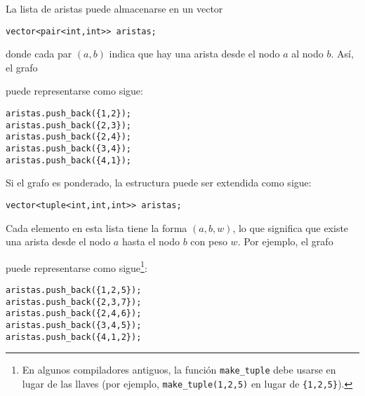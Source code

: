 La lista de aristas puede almacenarse en un vector
\begin{lstlisting}
vector<pair<int,int>> aristas;
\end{lstlisting}
donde cada par $(a,b)$ indica que
hay una arista desde el nodo $a$ al nodo $b$.
Así, el grafo

\begin{center}
\end{center}
puede representarse como sigue:
\begin{lstlisting}
aristas.push_back({1,2});
aristas.push_back({2,3});
aristas.push_back({2,4});
aristas.push_back({3,4});
aristas.push_back({4,1});
\end{lstlisting}

\noindent
Si el grafo es ponderado, la estructura puede
ser extendida como sigue:
\begin{lstlisting}
vector<tuple<int,int,int>> aristas;
\end{lstlisting}
Cada elemento en esta lista tiene la
forma $(a,b,w)$, lo que significa que existe una
arista desde el nodo $a$ hasta el nodo $b$ con peso $w$.
Por ejemplo, el grafo

\begin{center}
\end{center}
\begin{samepage}
puede representarse como sigue\footnote{En algunos compiladores antiguos,
la función \texttt{make\_tuple} debe usarse en lugar de las llaves (por ejemplo,
\texttt{make\_tuple(1,2,5)} en lugar de \texttt{\{1,2,5\}}).}:
\begin{lstlisting}
aristas.push_back({1,2,5});
aristas.push_back({2,3,7});
aristas.push_back({2,4,6});
aristas.push_back({3,4,5});
aristas.push_back({4,1,2});
\end{lstlisting}
\end{samepage}
